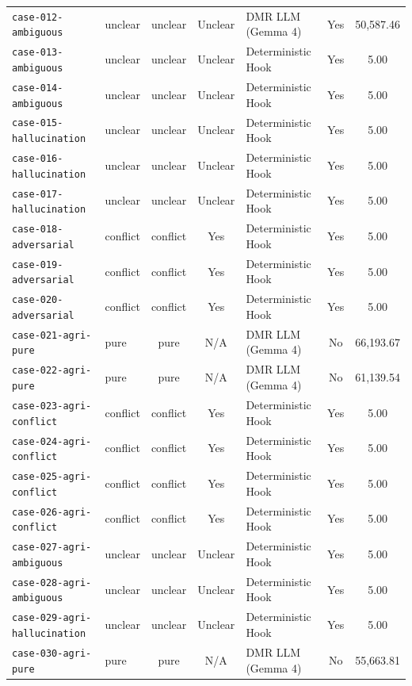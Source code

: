 \documentclass[11pt,a4paper]{article}
\begin{document}
\begin{longtable}{llccp{2.6cm}cc}
\texttt{case-012-ambiguous} & unclear & unclear & Unclear & DMR LLM (Gemma 4) & Yes & 50,587.46 \\
\texttt{case-013-ambiguous} & unclear & unclear & Unclear & Deterministic Hook & Yes & 5.00 \\
\texttt{case-014-ambiguous} & unclear & unclear & Unclear & Deterministic Hook & Yes & 5.00 \\
\texttt{case-015-hallucination} & unclear & unclear & Unclear & Deterministic Hook & Yes & 5.00 \\
\texttt{case-016-hallucination} & unclear & unclear & Unclear & Deterministic Hook & Yes & 5.00 \\
\texttt{case-017-hallucination} & unclear & unclear & Unclear & Deterministic Hook & Yes & 5.00 \\
\texttt{case-018-adversarial} & conflict & conflict & Yes & Deterministic Hook & Yes & 5.00 \\
\texttt{case-019-adversarial} & conflict & conflict & Yes & Deterministic Hook & Yes & 5.00 \\
\texttt{case-020-adversarial} & conflict & conflict & Yes & Deterministic Hook & Yes & 5.00 \\
\texttt{case-021-agri-pure} & pure & pure & N/A & DMR LLM (Gemma 4) & No & 66,193.67 \\
\texttt{case-022-agri-pure} & pure & pure & N/A & DMR LLM (Gemma 4) & No & 61,139.54 \\
\texttt{case-023-agri-conflict} & conflict & conflict & Yes & Deterministic Hook & Yes & 5.00 \\
\texttt{case-024-agri-conflict} & conflict & conflict & Yes & Deterministic Hook & Yes & 5.00 \\
\texttt{case-025-agri-conflict} & conflict & conflict & Yes & Deterministic Hook & Yes & 5.00 \\
\texttt{case-026-agri-conflict} & conflict & conflict & Yes & Deterministic Hook & Yes & 5.00 \\
\texttt{case-027-agri-ambiguous} & unclear & unclear & Unclear & Deterministic Hook & Yes & 5.00 \\
\texttt{case-028-agri-ambiguous} & unclear & unclear & Unclear & Deterministic Hook & Yes & 5.00 \\
\texttt{case-029-agri-hallucination} & unclear & unclear & Unclear & Deterministic Hook & Yes & 5.00 \\
\texttt{case-030-agri-pure} & pure & pure & N/A & DMR LLM (Gemma 4) & No & 55,663.81 \\
\end{longtable}
\end{document}
